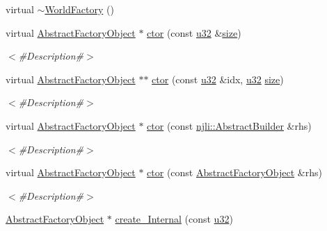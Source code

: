 \begin{DoxyCompactItemize}
\item 
virtual \mbox{\hyperlink{classnjli_1_1_world_factory_ad87dd40a3b3a963164477d74b5c001ab}{$\sim$\+World\+Factory}} ()
\item 
virtual \mbox{\hyperlink{classnjli_1_1_abstract_factory_object}{Abstract\+Factory\+Object}} $\ast$ \mbox{\hyperlink{classnjli_1_1_world_factory_a20a56f43a616363546d43fc1e90c6f08}{ctor}} (const \mbox{\hyperlink{_util_8h_a10e94b422ef0c20dcdec20d31a1f5049}{u32}} \&\mbox{\hyperlink{classnjli_1_1_world_factory_ad5d3fc4509c0939fd64f5d8473e915d2}{size}})
\begin{DoxyCompactList}\small\item\em $<$\#\+Description\#$>$ \end{DoxyCompactList}\item 
virtual \mbox{\hyperlink{classnjli_1_1_abstract_factory_object}{Abstract\+Factory\+Object}} $\ast$$\ast$ \mbox{\hyperlink{classnjli_1_1_world_factory_a1bdcf046664e630474e71c6ca48a54c5}{ctor}} (const \mbox{\hyperlink{_util_8h_a10e94b422ef0c20dcdec20d31a1f5049}{u32}} \&idx, \mbox{\hyperlink{_util_8h_a10e94b422ef0c20dcdec20d31a1f5049}{u32}} \mbox{\hyperlink{classnjli_1_1_world_factory_ad5d3fc4509c0939fd64f5d8473e915d2}{size}})
\begin{DoxyCompactList}\small\item\em $<$\#\+Description\#$>$ \end{DoxyCompactList}\item 
virtual \mbox{\hyperlink{classnjli_1_1_abstract_factory_object}{Abstract\+Factory\+Object}} $\ast$ \mbox{\hyperlink{classnjli_1_1_world_factory_a5646bfc3148c2e87ecf1bab41a933674}{ctor}} (const \mbox{\hyperlink{classnjli_1_1_abstract_builder}{njli\+::\+Abstract\+Builder}} \&rhs)
\begin{DoxyCompactList}\small\item\em $<$\#\+Description\#$>$ \end{DoxyCompactList}\item 
virtual \mbox{\hyperlink{classnjli_1_1_abstract_factory_object}{Abstract\+Factory\+Object}} $\ast$ \mbox{\hyperlink{classnjli_1_1_world_factory_a313445ddb5ed04a442bda2af7a6a1287}{ctor}} (const \mbox{\hyperlink{classnjli_1_1_abstract_factory_object}{Abstract\+Factory\+Object}} \&rhs)
\begin{DoxyCompactList}\small\item\em $<$\#\+Description\#$>$ \end{DoxyCompactList}\item 
\mbox{\hyperlink{classnjli_1_1_abstract_factory_object}{Abstract\+Factory\+Object}} $\ast$ \mbox{\hyperlink{classnjli_1_1_world_factory_a125d628843dd041a05fad61340caaad6}{create\+\_\+\+Internal}} (const \mbox{\hyperlink{_util_8h_a10e94b422ef0c20dcdec20d31a1f5049}{u32}})
$$
\end{DoxyCompactItemize}
